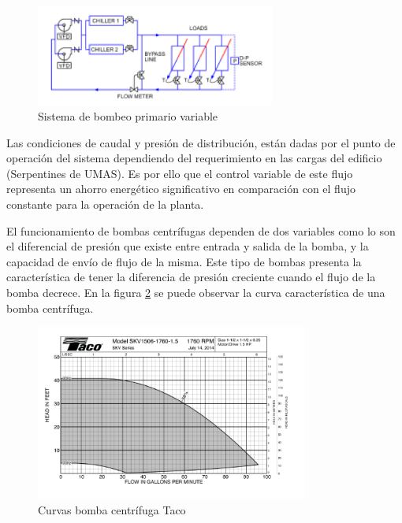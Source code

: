  \begin{figure}[H]
    \centering
    \includegraphics[width=0.70\textwidth]{2_MainMatter/Capitulo2/Imagenes/PlantaAguaHelada.PNG}
    \caption{Sistema de bombeo primario variable \cite{SistemaBombeoPrimario}}
    \label{fig:SistemaBombeoPrimario}
\end{figure}
Las condiciones de caudal y presión de distribución, están dadas por el punto de operación del sistema dependiendo del requerimiento en las cargas del edificio (Serpentines de UMAS). Es por ello que el control variable de este flujo representa un ahorro energético significativo en comparación con el flujo constante para la operación de la planta.

El funcionamiento de bombas centrífugas dependen de dos variables como lo son el diferencial de presión que existe entre entrada y salida de la bomba, y la capacidad de envío de flujo de la misma. Este tipo de bombas presenta la característica de tener la diferencia de presión creciente cuando el flujo de la bomba decrece. En la figura \ref{fig:CurvaControlTaco} se puede observar la curva característica de una bomba centrífuga.

\begin{figure}[H]
    \centering
    \includegraphics[width=0.80\textwidth]{2_MainMatter/Capitulo2/Imagenes/CurvacontrolTaco.PNG}
    \caption{Curvas bomba centrífuga Taco \cite{BombaTaco}}
    \label{fig:CurvaControlTaco}
\end{figure}

